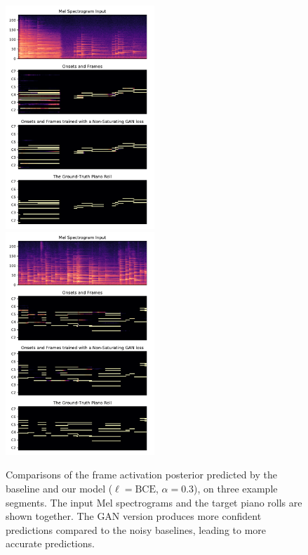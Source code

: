 \begin{figure}[t]
	\centering
	\hspace{-0.02\textwidth}
	\includegraphics[width=0.499\textwidth]{predictions-115.pdf}%
	\includegraphics[width=0.499\textwidth]{predictions-73.pdf}%
	\endminipage
	\caption{Comparisons of the frame activation posterior predicted by the baseline and our model ($\ell = \text{BCE}$, $\alpha = 0.3$), on three example segments. The input Mel spectrograms and the target piano rolls are shown together. The GAN version produces more confident predictions compared to the noisy baselines, leading to more accurate predictions.}\label{fig:predictions}
\end{figure}

